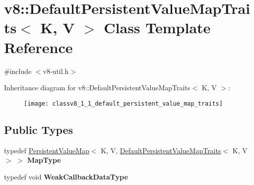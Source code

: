 \hypertarget{classv8_1_1_default_persistent_value_map_traits}{}\section{v8\+:\+:Default\+Persistent\+Value\+Map\+Traits$<$ K, V $>$ Class Template Reference}
\label{classv8_1_1_default_persistent_value_map_traits}


{\ttfamily \#include $<$v8-\/util.\+h$>$}

Inheritance diagram for v8\+:\+:Default\+Persistent\+Value\+Map\+Traits$<$ K, V $>$\+:\begin{figure}[H]
\begin{center}
\leavevmode
\texttt{[image: classv8\_1\_1\_default\_persistent\_value\_map\_traits]}
\end{center}
\end{figure}
\subsection*{Public Types}
\begin{DoxyCompactItemize}
\item 
\hypertarget{classv8_1_1_default_persistent_value_map_traits_a05cbd536d6bb9ba4949198351e074854}{}typedef \hyperlink{classv8_1_1_persistent_value_map}{Persistent\+Value\+Map}$<$ K, V, \hyperlink{classv8_1_1_default_persistent_value_map_traits}{Default\+Persistent\+Value\+Map\+Traits}$<$ K, V $>$ $>$ {\bfseries Map\+Type}\label{classv8_1_1_default_persistent_value_map_traits_a05cbd536d6bb9ba4949198351e074854}

\item 
\hypertarget{classv8_1_1_default_persistent_value_map_traits_a379f8c42e727a9576fb0954bb0245d8f}{}typedef void {\bfseries Weak\+Callback\+Data\+Type}\label{classv8_1_1_default_persistent_value_map_traits_a379f8c42e727a9576fb0954bb0245d8f}

\end{DoxyCompactItemize}
